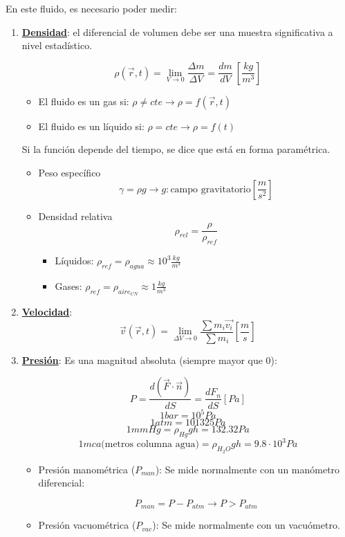 En este fluido, es necesario poder medir:
\begin{enumerate}
	\item \underline{\textbf{Densidad}}: el diferencial de volumen debe ser una muestra significativa a nivel estadístico.
	
	\[\rho(\vec{r},t)=\lim_{{V \to 0}} \frac{\Delta m}{\Delta V}=\frac{dm}{dV} \ \left[{\frac{kg}{m^3}}\right]\] 
	
	
	\begin{itemize}
		\item El fluido es un gas si: $\rho \neq cte \rightarrow \rho=f(\vec{r},t)$
		\item El fluido es un líquido si: $\rho = cte \rightarrow \rho=f(t)$
	\end{itemize}
	
	Si la función depende del tiempo, se dice que está en forma paramétrica.
	
	\begin{itemize}
		\item Peso específico
		\[\gamma=\rho g  \rightarrow g: \text{campo gravitatorio} \left[{\frac{m}{s^2}}\right]\]
		\item Densidad relativa
		\[\rho_{rel}=\frac{\rho}{\rho_{ref}}\]
		
		\begin{itemize}
			\item Líquidos: $\rho_{ref}=\rho_{agua}\approx 10^3 \frac{kg}{m^3}$
				\item Gases: $\rho_{ref}=\rho_{aire_{CN}}\approx 1 \frac{kg}{m^3}$
		\end{itemize}
	\end{itemize}
		
	\item \underline{\textbf{Velocidad}}:
	\[\vec{v}(\vec{r},t)=\lim_{{\Delta V \to 0}} \frac{\sum m_i \vec{v_i}}{\sum m_i} \left[{\frac{m}{s}}\right]\]
	\item \underline{\textbf{Presión}}: Es una magnitud absoluta (siempre mayor que 0):
	
	\[P=\frac{d(\vec{F}\cdot\vec{n})}{dS} =\frac{d{F_n}}{dS} [Pa]\]
	\[1 bar = 10^5 Pa\]
	\[1 atm = 101325 Pa\]
	\[1 mmHg =\rho_{Hg}gh=132.32 Pa\]
	\[1 mca \text{(metros columna agua)} = \rho_{H_2O}gh=9.8\cdot 10^3 Pa\]
	\begin{itemize}
		\item Presión manométrica ($P_{man}$): Se mide normalmente con un manómetro diferencial:
		
		\[P_{man} = P - P_{atm} \rightarrow P>P_{atm}\]
		\item Presión vacuométrica ($P_{vac}$): Se mide normalmente con un vacuómetro.
		

\end{itemize}
\end{enumerate}

